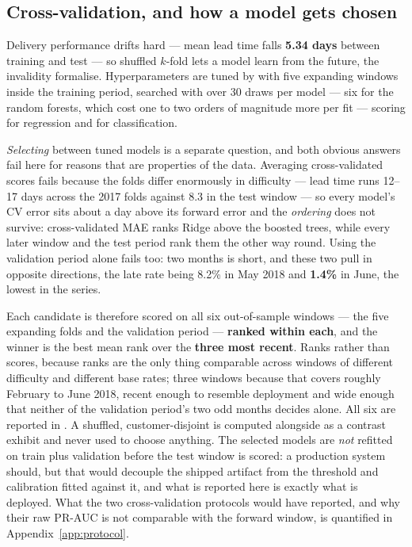 \subsection{Cross-validation, and how a model gets chosen}
\label{sec:cv}

Delivery performance drifts hard --- mean lead time falls \textbf{5.34 days}
between training and test --- so shuffled $k$-fold lets a model learn from the
future, the invalidity \citet{bergmeir2012cv} formalise. Hyperparameters are
tuned by  with five expanding windows inside the training
period, searched with  \citep{bergstra2012random} over
30 draws per model --- six for the random forests, which cost one to two orders
of magnitude more per fit --- scoring  for
regression and  for classification.

\emph{Selecting} between tuned models is a separate question, and both obvious
answers fail here for reasons that are properties of the data. Averaging
cross-validated scores fails because the folds differ enormously in difficulty
--- lead time runs 12--17 days across the 2017 folds against 8.3 in the test
window --- so every model's CV error sits about a day above its forward error and
the \emph{ordering} does not survive: cross-validated MAE ranks Ridge above the
boosted trees, while every later window and the test period rank them the other
way round. Using the validation period alone fails too: two months is short, and
these two pull in opposite directions, the late rate being 8.2\% in May 2018 and
\textbf{1.4\%} in June, the lowest in the series.

Each candidate is therefore scored on all six out-of-sample windows ---
the five expanding folds and the validation period --- \textbf{ranked within
each}, and the winner is the best mean rank over the \textbf{three most recent}.
Ranks rather than scores, because ranks are the only thing comparable across
windows of different difficulty and different base rates; three windows because
that covers roughly February to June 2018, recent enough to resemble deployment
and wide enough that neither of the validation period's two odd months decides
alone. All six are reported in . A
shuffled, customer-disjoint  is computed alongside as
a contrast exhibit and never used to choose anything. The selected models are
\emph{not} refitted on train plus validation before the test window is scored: a
production system should, but that would decouple the shipped artifact from the
threshold and calibration fitted against it, and what is reported here is exactly
what is deployed. What the two cross-validation protocols would have reported,
and why their raw PR-AUC is not comparable with the forward window, is
quantified in Appendix~\ref{app:protocol}.

